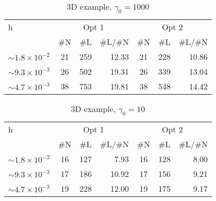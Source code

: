 \documentclass[12pt]{article}
\begin{document}
\begin{table}
    \centering
    \begin{tabular}{lccrccr}\toprule
       h & \multicolumn{3}{c}{Opt 1} & \multicolumn{3}{c}{Opt 2}
       \\\cmidrule(lr){2-4}\cmidrule(lr){5-7} 
                  & \#N& \#L & \#L/\#N &\#N& \#L & \#L/\#N\\\midrule
  $\sim 1.8 \times 10^{-2}$ & 21& 259 & 12.33 & 21 & 228 & 10.86\\
  $\sim 9.3 \times 10^{-3}$ & 26 & 502 & 19.31& 26& 339 & 13.04 \\
  $\sim 4.7 \times 10^{-3}$ & 38 & 753 & 19.81 & 38 & 548 & 14.42 \\
        \bottomrule
        \end{tabular}
        \caption{3D example, $ \gamma_0 = 1000$ \hfill}
       \end{table}

\begin{table}
    \centering
    \begin{tabular}{lccrccr}\toprule
       h & \multicolumn{3}{c}{Opt 1} & \multicolumn{3}{c}{Opt 2}
       \\\cmidrule(lr){2-4}\cmidrule(lr){5-7} 
                  & \#N& \#L & \#L/\#N &\#N& \#L & \#L/\#N\\\midrule
  $\sim 1.8 \times 10^{-2}$ & 16& 127 & 7.93 & 16 & 128 & 8.00\\
  $\sim 9.3 \times 10^{-3}$ & 17 & 186 & 10.92& 17& 156 & 9.21 \\
  $\sim 4.7 \times 10^{-3}$ & 19 & 228 & 12.00 & 19 & 175 & 9.17 \\
        \bottomrule
        \end{tabular}
        \caption{3D example, $ \gamma_0 = 10$}
       \end{table}
\end{document}
